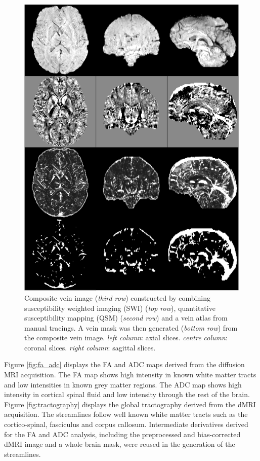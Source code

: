 \documentclass[smallextended]{svjour3}       %
\begin{document}
\begin{figure}
    \centering
    \includegraphics[width=\textwidth]{../figures/veins}
  \caption{Composite vein image (\emph{third row}) constructed by
  combining susceptibility weighted imaging (SWI) (\emph{top row}),
  quantitative susceptibility mapping (QSM) (\emph{second row})
  and a vein atlas from manual tracings. A vein mask was then
  generated (\emph{bottom row}) from the composite
  vein image.
  \emph{left column}: axial slices. \emph{centre column}: coronal slices.
  \emph{right column}: sagittal slices.}
\label{fig:veins}
\end{figure}

Figure \ref{fig:fa_adc}  displays the FA and ADC maps derived from the diffusion MRI
acquisition. The FA map shows high intensity in known white matter
tracts and low intensities in known grey matter regions. The ADC map
shows high intensity in cortical spinal fluid and low intensity through
the rest of the brain.
Figure \ref{fig:tractography} displays the global tractography derived from the dMRI
acquisition. The streamlines follow well known white matter tracts such
as the cortico-spinal, fasciculus and corpus callosum. Intermediate
derivatives derived for the FA and ADC analysis, including the
preprocessed and bias-corrected dMRI image and a whole brain mask, were
reused in the generation of the streamlines.
\end{document}
